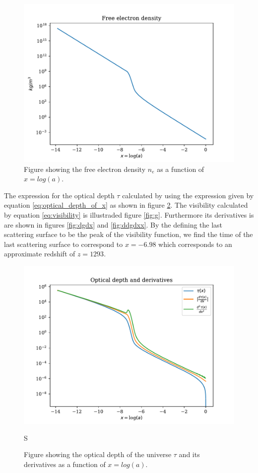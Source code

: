 \documentclass[onecolumn]{aastex62}
\begin{document}
\begin{figure}
    \includegraphics[scale=0.8]{figures/ne.pdf}
    \caption{Figure showing the free electron density $n_e$ as a function of $x=log(a)$.}
    \label{fig:ne}
\end{figure}
The expression for the optical depth $\tau$ calculated by using the expression given by equation \ref{eq:optical_depth_of_x} as shown in figure \ref{fig:tau}.
The visibility calculated by equation \ref{eq:visibility} is illustraded figure \ref{fig:g}. Furthermore its derivatives is are shown in figures \ref{fig:dgdx} and \ref{fig:ddgdxx}.
By the defining the last scattering surface to be the peak of the visibility function, we find the time of the last scattering surface to correspond to $x=-6.98$ which corresponds to an approximate redshift of $z=1293$.
\begin{figure}
    \includegraphics[scale=0.8]{figures/tau.pdf}
    \caption{Figure showing the optical depth of the universe $\tau$ and its derivatives as a function of $x=log(a)$.}S
    \label{fig:tau}
\end{figure}
\end{document}
